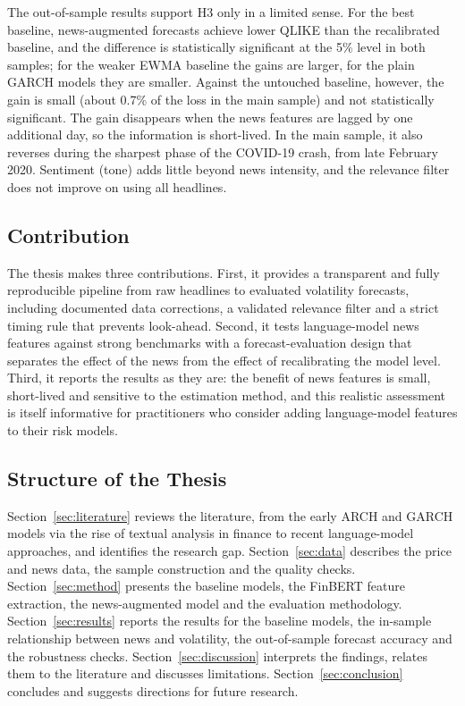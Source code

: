 \documentclass[12pt,a4paper]{article}
\begin{document}
The out-of-sample results support H3 only in a limited sense. For the best baseline, news-augmented forecasts achieve lower QLIKE than the recalibrated baseline, and the difference is statistically significant at the 5\% level in both samples; for the weaker EWMA baseline the gains are larger, for the plain GARCH models they are smaller. Against the untouched baseline, however, the gain is small (about 0.7\% of the loss in the main sample) and not statistically significant. The gain disappears when the news features are lagged by one additional day, so the information is short-lived. In the main sample, it also reverses during the sharpest phase of the COVID-19 crash, from late February 2020. Sentiment (tone) adds little beyond news intensity, and the relevance filter does not improve on using all headlines.

\subsection{Contribution}\label{sec:contribution}
The thesis makes three contributions. First, it provides a transparent and fully reproducible pipeline from raw headlines to evaluated volatility forecasts, including documented data corrections, a validated relevance filter and a strict timing rule that prevents look-ahead. Second, it tests language-model news features against strong benchmarks with a forecast-evaluation design that separates the effect of the news from the effect of recalibrating the model level. Third, it reports the results as they are: the benefit of news features is small, short-lived and sensitive to the estimation method, and this realistic assessment is itself informative for practitioners who consider adding language-model features to their risk models.

\subsection{Structure of the Thesis}\label{sec:structure}
Section~\ref{sec:literature} reviews the literature, from the early ARCH and GARCH models via the rise of textual analysis in finance to recent language-model approaches, and identifies the research gap. Section~\ref{sec:data} describes the price and news data, the sample construction and the quality checks. Section~\ref{sec:method} presents the baseline models, the FinBERT feature extraction, the news-augmented model and the evaluation methodology. Section~\ref{sec:results} reports the results for the baseline models, the in-sample relationship between news and volatility, the out-of-sample forecast accuracy and the robustness checks. Section~\ref{sec:discussion} interprets the findings, relates them to the literature and discusses limitations. Section~\ref{sec:conclusion} concludes and suggests directions for future research.
\end{document}
